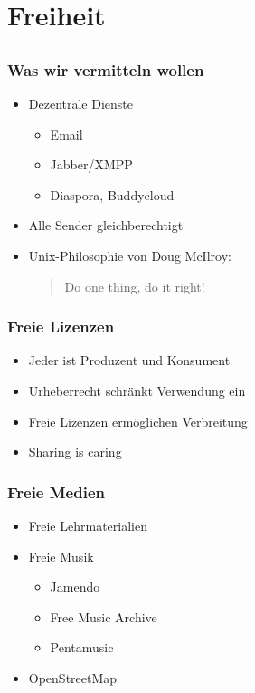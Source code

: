 \documentclass{beamer}
\newcommand{\ben}[1]{\pdfcomment[author=Ben]{#1}}
\begin{document}
\section{Freiheit}
\subsection{}

\begin{frame}
  \frametitle{Was wir vermitteln wollen}
  \begin{itemize}
    \item<2-> Dezentrale Dienste
      \begin{itemize}
        \item<3-> Email
        \item<4-> Jabber/XMPP
        \item<5-> Diaspora, Buddycloud
      \end{itemize}
    \item<6-> Alle Sender gleichberechtigt
    \item<7-> Unix-Philosophie von Doug McIlroy:
        \begin{quote}Do one thing, do it right!
        \end{quote}
  \end{itemize}
\end{frame}

\begin{frame}
  \frametitle{Freie Lizenzen}
  \begin{itemize}
    \item<2-> Jeder ist Produzent und Konsument
    \item<3-> Urheberrecht schränkt Verwendung ein
    \item<4-> Freie Lizenzen ermöglichen Verbreitung \textcopyleft
    \item<5-> Sharing is caring
  \end{itemize}
\end{frame}

\begin{frame}
  \frametitle{Freie Medien}
  \begin{itemize}
    \item<2-> Freie Lehrmaterialien
    \item<3-> Freie Musik
      \begin{itemize}
        \item Jamendo
        \item Free Music Archive
        \item Pentamusic
      \end{itemize}
    \item<4-> OpenStreetMap
  \end{itemize}
\end{frame}
\end{document}
